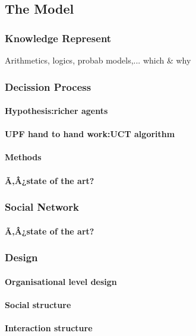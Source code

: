 \documentclass{report}
\begin{document}
\begin{enumeration}
\begin{end}
		\subsection{The Model}
			\subsubsection{Knowledge Represent}
				Arithmetics, logics, probab models,... which \& why

			\subsubsection{Decission Process}
				\paragraph{Hypothesis:richer agents}
				\paragraph{UPF hand to hand work:UCT algorithm}
				\paragraph{Methods}
				\paragraph{Ã‚Â¿state of the art?}

			\subsubsection{Social Network}
				\paragraph{Ã‚Â¿state of the art?}

			\subsubsection{Design}
				\paragraph{Organisational level design}
				\paragraph{Social structure}
				\paragraph{Interaction structure}

\end{end}
\end{enumeration}
\end{document}
